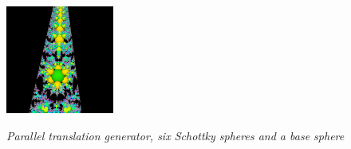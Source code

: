 \begin{figure}[h!tbp]
\begin{minipage}[t]{0.5\hsize}
\begin{minipage}{0.25\hsize}
   \label{fig:translation3dGen}
  \end{minipage}
  \hspace*{\fill}
 \begin{minipage}{0.25\hsize}
  \center
  \includegraphics[width=1.4in, height=1.4in, keepaspectratio]{./img/application/3dGen/translationOrbit.pdf}
    \label{fig:translation3dOrb}
 \end{minipage}
  \hspace*{\fill}
  \caption{\textit{Parallel translation generator, six Schottky spheres
  and a base sphere}}
  \label{fig:translation3d}
 \end{minipage}
\end{figure}

